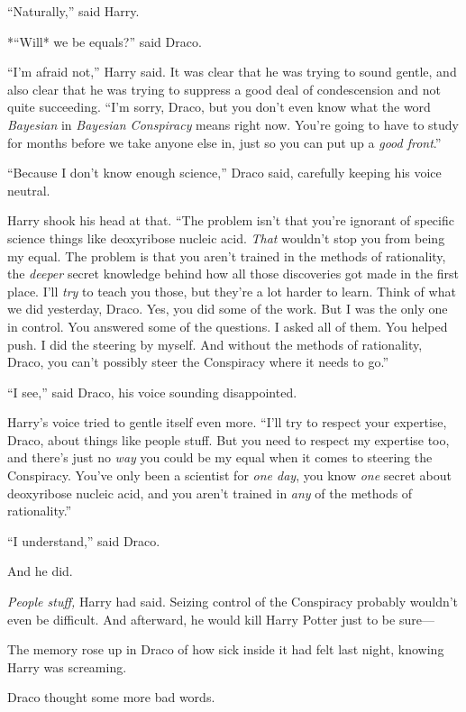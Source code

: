 ``Naturally,'' said Harry.

*``Will* we be equals?'' said Draco.

``I'm afraid not,'' Harry said. It was clear that he was trying to sound
gentle, and also clear that he was trying to suppress a good deal of
condescension and not quite succeeding. ``I'm sorry, Draco, but you
don't even know what the word \emph{Bayesian} in \emph{Bayesian
Conspiracy} means right now. You're going to have to study for months
before we take anyone else in, just so you can put up a \emph{good
front}.''

``Because I don't know enough science,'' Draco said, carefully keeping
his voice neutral.

Harry shook his head at that. ``The problem isn't that you're ignorant
of specific science things like deoxyribose nucleic acid. \emph{That}
wouldn't stop you from being my equal. The problem is that you aren't
trained in the methods of rationality, the \emph{deeper} secret
knowledge behind how all those discoveries got made in the first place.
I'll \emph{try} to teach you those, but they're a lot harder to learn.
Think of what we did yesterday, Draco. Yes, you did some of the work.
But I was the only one in control. You answered some of the questions. I
asked all of them. You helped push. I did the steering by myself. And
without the methods of rationality, Draco, you can't possibly steer the
Conspiracy where it needs to go.''

``I see,'' said Draco, his voice sounding disappointed.

Harry's voice tried to gentle itself even more. ``I'll try to respect
your expertise, Draco, about things like people stuff. But you need to
respect my expertise too, and there's just no \emph{way} you could be my
equal when it comes to steering the Conspiracy. You've only been a
scientist for \emph{one day}, you know \emph{one} secret about
deoxyribose nucleic acid, and you aren't trained in \emph{any} of the
methods of rationality.''

``I understand,'' said Draco.

And he did.

\emph{People stuff,} Harry had said. Seizing control of the Conspiracy
probably wouldn't even be difficult. And afterward, he would kill Harry
Potter just to be sure---

The memory rose up in Draco of how sick inside it had felt last night,
knowing Harry was screaming.

Draco thought some more bad words.

